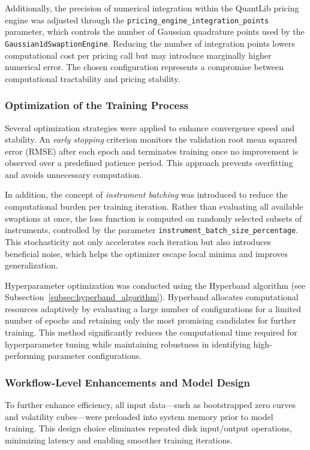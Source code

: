 {Additionally, the precision of numerical integration within the QuantLib pricing engine was adjusted through the \texttt{pricing\_engine\_integration\_points} parameter, which controls the number of Gaussian quadrature points used by the \texttt{Gaussian1dSwaptionEngine}. Reducing the number of integration points lowers computational cost per pricing call but may introduce marginally higher numerical error. The chosen configuration represents a compromise between computational tractability and pricing stability.

\subsubsection{Optimization of the Training Process}
Several optimization strategies were applied to enhance convergence speed and stability. An \textit{early stopping} criterion monitors the validation root mean squared error (RMSE) after each epoch and terminates training once no improvement is observed over a predefined patience period. This approach prevents overfitting and avoids unnecessary computation.

In addition, the concept of \textit{instrument batching} was introduced to reduce the computational burden per training iteration. Rather than evaluating all available swaptions at once, the loss function is computed on randomly selected subsets of instruments, controlled by the parameter \texttt{instrument\_batch\_size\_percentage}. This stochasticity not only accelerates each iteration but also introduces beneficial noise, which helps the optimizer escape local minima and improves generalization.

Hyperparameter optimization was conducted using the Hyperband algorithm (see Subsection~\ref{subsec:hyperband_algorithm}). Hyperband allocates computational resources adaptively by evaluating a large number of configurations for a limited number of epochs and retaining only the most promising candidates for further training. This method significantly reduces the computational time required for hyperparameter tuning while maintaining robustness in identifying high-performing parameter configurations.

\subsubsection{Workflow-Level Enhancements and Model Design}
To further enhance efficiency, all input data—such as bootstrapped zero curves and volatility cubes—were preloaded into system memory prior to model training. This design choice eliminates repeated disk input/output operations, minimizing latency and enabling smoother training iterations.

}
